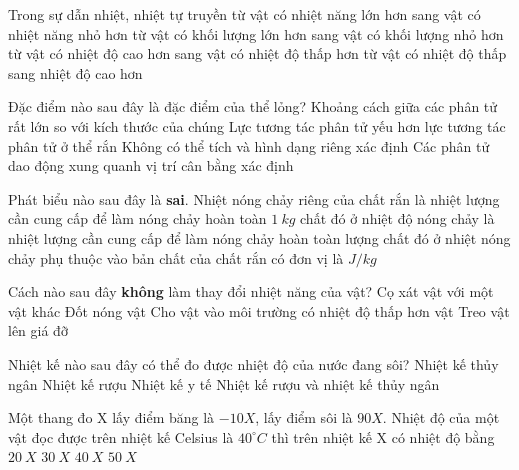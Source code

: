 \begin{ex} %
	Trong sự dẫn nhiệt, nhiệt tự truyền
	\choice
	{từ vật có nhiệt năng lớn hơn sang vật có nhiệt năng nhỏ hơn}
	{từ vật có khối lượng lớn hơn sang vật có khối lượng nhỏ hơn}
	{\True từ vật có nhiệt độ cao hơn sang vật có nhiệt độ thấp hơn}
	{từ vật có nhiệt độ thấp sang nhiệt độ cao hơn}
	\loigiai{}
\end{ex}

\begin{ex} %
	Đặc điểm nào sau đây là đặc điểm của thể lỏng?
	\choice
	{Khoảng cách giữa các phân tử rất lớn so với kích thước của chúng}
	{\True Lực tương tác phân tử yếu hơn lực tương tác phân tử ở thể rắn}
	{Không có thể tích và hình dạng riêng xác định}
	{Các phân tử dao động xung quanh vị trí cân bằng xác định}
	\loigiai{}
\end{ex}

\begin{ex} %
Phát biểu nào sau đây là \textbf{sai}. Nhiệt nóng chảy riêng của chất rắn
	\choice
	{là nhiệt lượng cần cung cấp để làm nóng chảy hoàn toàn $1\ kg$ chất đó ở nhiệt độ nóng chảy}
	{\True là nhiệt lượng cần cung cấp để làm nóng chảy hoàn toàn lượng chất đó ở nhiệt nóng chảy}
	{phụ thuộc vào bản chất của chất rắn}
	{có đơn vị là $J/kg$}
	\loigiai{}
\end{ex}


\begin{ex}%
	Cách nào sau đây \textbf{không} làm thay đổi nhiệt năng của vật?
	\choice
	{Cọ xát vật với một vật khác}
	{Đốt nóng vật}
	{Cho vật vào môi trường có nhiệt độ thấp hơn vật}
	{\True Treo vật lên giá đỡ}
	\loigiai{
		
	}
\end{ex}

\begin{ex}%
	Nhiệt kế nào sau đây có thể đo được nhiệt độ của nước đang sôi?
	\choice
	{\True Nhiệt kế thủy ngân}
	{Nhiệt kế rượu}
	{Nhiệt kế y tế}
	{Nhiệt kế rượu và nhiệt kế thủy ngân}
	\loigiai{
		
	}
\end{ex}

\begin{ex}%
	
	Một thang đo X lấy điểm băng là $-10X$, lấy điểm sôi là $90X$. Nhiệt độ của một vật đọc được trên nhiệt kế Celsius là $40^\circ C$ thì trên nhiệt kế X có nhiệt độ bằng
	\choice
	{$20\ X$}
	{\True $30\ X$}
	{$40\ X$}
	{$50\ X$}
\end{ex}

